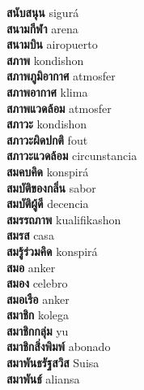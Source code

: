 \textbf{ สนับสนุน  } sigurá \\
\textbf{ สนามกีฬา  } arena \\
\textbf{ สนามบิน  } airopuerto \\
\textbf{ สภาพ  } kondishon \\
\textbf{ สภาพภูมิอากาศ  } atmosfer \\
\textbf{ สภาพอากาศ  } klima \\
\textbf{ สภาพแวดล้อม  } atmosfer \\
\textbf{ สภาวะ  } kondishon \\
\textbf{ สภาวะผิดปกติ  } fout \\
\textbf{ สภาวะแวดล้อม  } circunstancia \\
\textbf{ สมคบคิด  } konspirá \\
\textbf{ สมบัติของกลิ่น  } sabor \\
\textbf{ สมบัติผู้ดี  } decencia \\
\textbf{ สมรรถภาพ  } kualifikashon \\
\textbf{ สมรส  } casa \\
\textbf{ สมรู้ร่วมคิด  } konspirá \\
\textbf{ สมอ  } anker \\
\textbf{ สมอง  } celebro \\
\textbf{ สมอเรือ  } anker \\
\textbf{ สมาชิก  } kolega \\
\textbf{ สมาชิกกลุ่ม  } yu \\
\textbf{ สมาชิกสิ่งพิมพ์  } abonado \\
\textbf{ สมาพันธรัฐสวิส  } Suisa \\
\textbf{ สมาพันธ์  } aliansa \\
